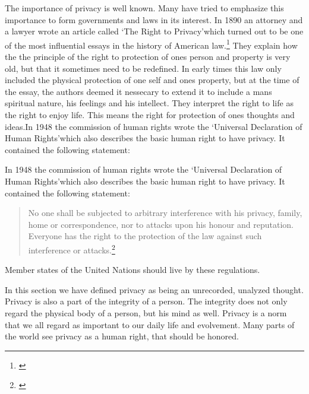 The importance of privacy is well known. Many have tried to emphasize this importance to form governments and laws in its interest.
In 1890 an attorney and a lawyer wrote an article called  \lq The Right to Privacy\rq which turned out to be one of the most influential essays in the history of American law.\footnote{\cite{website:the-right-to-privacy-info}}
They explain how the the principle of the right to protection of ones person and property is very old, but that it sometimes need to be redefined. In early times this law only included the physical protection of one self and ones property, but at the time of the essay, the authors deemed it nessecary to extend it to include a mans spiritual nature, his feelings and his intellect. They interpret the right to life as the right to enjoy life. This means the right for protection of ones thoughts and ideas.In 1948 the commission of human rights wrote the \lq Universal Declaration of Human Rights\rq which also describes the basic human right to have privacy. It contained the following statement:

In 1948 the commission of human rights wrote the \lq Universal Declaration of Human Rights\rq which also describes the basic human right to have privacy. It contained the following statement:

\blockquote{No one shall be subjected to arbitrary interference with his privacy, family, home or correspondence, nor to attacks upon his honour and reputation. Everyone has the right to the protection of the law against such interference or attacks.\footnote{\cite{website:un-human-rights}}}

Member states of the United Nations should live by these regulations.


In this section we have defined privacy as being an unrecorded, unalyzed thought. Privacy is also a part of the integrity of a person. The integrity does not only regard the physical body of a person, but his mind as well.
Privacy is a norm that we all regard as important to our daily life and evolvement. Many parts of the world see privacy as a human right, that should be honored.

\newpage
